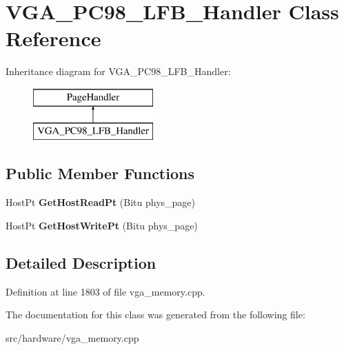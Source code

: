 \hypertarget{classVGA__PC98__LFB__Handler}{\section{V\-G\-A\-\_\-\-P\-C98\-\_\-\-L\-F\-B\-\_\-\-Handler Class Reference}
\label{classVGA__PC98__LFB__Handler}
}
Inheritance diagram for V\-G\-A\-\_\-\-P\-C98\-\_\-\-L\-F\-B\-\_\-\-Handler\-:\begin{figure}[H]
\begin{center}
\leavevmode
\includegraphics[height=2.000000cm]{classVGA__PC98__LFB__Handler}
\end{center}
\end{figure}
\subsection*{Public Member Functions}
\begin{DoxyCompactItemize}
\item 
\hypertarget{classVGA__PC98__LFB__Handler_a4adcd67e79fa7efac624f0cb029a6e58}{Host\-Pt {\bfseries Get\-Host\-Read\-Pt} (Bitu phys\-\_\-page)}\label{classVGA__PC98__LFB__Handler_a4adcd67e79fa7efac624f0cb029a6e58}

\item 
\hypertarget{classVGA__PC98__LFB__Handler_a552bc6064954666ef812ae02e62fb039}{Host\-Pt {\bfseries Get\-Host\-Write\-Pt} (Bitu phys\-\_\-page)}\label{classVGA__PC98__LFB__Handler_a552bc6064954666ef812ae02e62fb039}

\end{DoxyCompactItemize}


\subsection{Detailed Description}


Definition at line 1803 of file vga\-\_\-memory.\-cpp.



The documentation for this class was generated from the following file\-:\begin{DoxyCompactItemize}
\item 
src/hardware/vga\-\_\-memory.\-cpp\end{DoxyCompactItemize}
